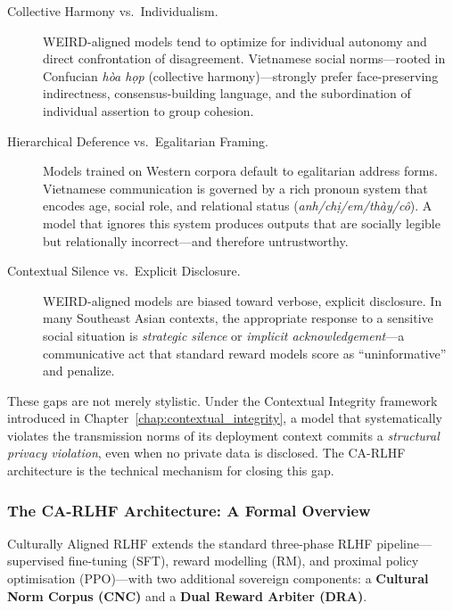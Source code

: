 \begin{description}
  \item[Collective Harmony vs.\ Individualism.]
    WEIRD-aligned models tend to optimize for individual autonomy
    and direct confrontation of disagreement.
    Vietnamese social norms---rooted in Confucian \textit{h\`{o}a
    h\d{o}p} (collective harmony)---strongly prefer face-preserving
    indirectness, consensus-building language, and the subordination
    of individual assertion to group cohesion.

  \item[Hierarchical Deference vs.\ Egalitarian Framing.]
    Models trained on Western corpora default to egalitarian
    address forms.
    Vietnamese communication is governed by a rich pronoun system
    that encodes age, social role, and relational status
    (\textit{anh/ch\d{i}/em/th\`{a}y/c\^{o}}).
    A model that ignores this system produces outputs that are
    socially legible but relationally incorrect---and therefore
    untrustworthy.

  \item[Contextual Silence vs.\ Explicit Disclosure.]
    WEIRD-aligned models are biased toward verbose, explicit
    disclosure.
    In many Southeast Asian contexts, the appropriate response to a
    sensitive social situation is \emph{strategic silence} or
    \emph{implicit acknowledgement}---a communicative act that
    standard reward models score as ``uninformative'' and penalize.
\end{description}

These gaps are not merely stylistic.
Under the Contextual Integrity framework introduced in
Chapter~\ref{chap:contextual_integrity}, a model that systematically
violates the transmission norms of its deployment context commits a
\emph{structural privacy violation}, even when no private data is
disclosed.
The CA-RLHF architecture is the technical mechanism for closing
this gap.

\subsubsection{The CA-RLHF Architecture: A Formal Overview}
\label{subsubsec:ca-rlhf-overview}

Culturally Aligned RLHF extends the standard three-phase RLHF
pipeline---supervised fine-tuning (SFT), reward modelling (RM), and
proximal policy optimisation (PPO)---with two additional sovereign
components: a \textbf{Cultural Norm Corpus (CNC)} and a
\textbf{Dual Reward Arbiter (DRA)}.

